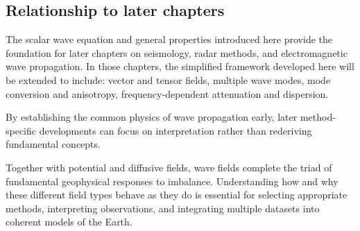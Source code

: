 \subsection{Relationship to later chapters}
The scalar wave equation and general properties introduced here provide the foundation for later chapters on seismology, radar methods, and electromagnetic wave propagation. In those chapters, the simplified framework developed here will be extended to include: vector and tensor fields, multiple wave modes, mode conversion and anisotropy, frequency-dependent attenuation and dispersion.

By establishing the common physics of wave propagation early, later method-specific developments can focus on interpretation rather than rederiving fundamental concepts.

Together with potential and diffusive fields, wave fields complete the triad of fundamental geophysical responses to imbalance. Understanding how and why these different field types behave as they do is essential for selecting appropriate methods, interpreting observations, and integrating multiple datasets into coherent models of the Earth.
